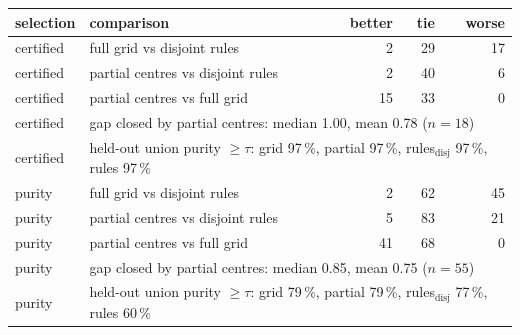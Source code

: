 \begin{tabular}{llrrr}
\toprule
selection & comparison & better & tie & worse\\
\midrule
certified & full grid vs disjoint rules & 2 & 29 & 17\\
certified & partial centres vs disjoint rules & 2 & 40 & 6\\
certified & partial centres vs full grid & 15 & 33 & 0\\
certified & \multicolumn{4}{l}{gap closed by partial centres: median 1.00, mean 0.78 ($n=18$)}\\
certified & \multicolumn{4}{l}{held-out union purity $\ge\tau$: grid 97\,\%, partial 97\,\%, rules$_{\mathrm{disj}}$ 97\,\%, rules 97\,\%}\\
\midrule
purity & full grid vs disjoint rules & 2 & 62 & 45\\
purity & partial centres vs disjoint rules & 5 & 83 & 21\\
purity & partial centres vs full grid & 41 & 68 & 0\\
purity & \multicolumn{4}{l}{gap closed by partial centres: median 0.85, mean 0.75 ($n=55$)}\\
purity & \multicolumn{4}{l}{held-out union purity $\ge\tau$: grid 79\,\%, partial 79\,\%, rules$_{\mathrm{disj}}$ 77\,\%, rules 60\,\%}\\
\bottomrule
\end{tabular}
